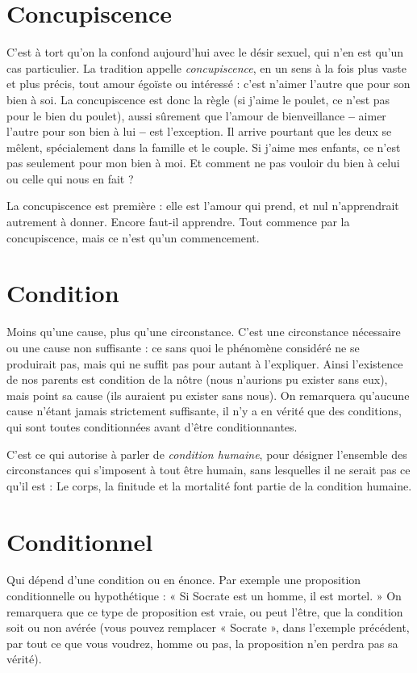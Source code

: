 \section{Concupiscence}
C’est à tort qu’on la confond aujourd’hui avec le
désir sexuel, qui n’en est qu’un cas particulier. La tradition
appelle {\it concupiscence}, en un sens à la fois plus vaste et plus précis, tout
amour égoïste ou intéressé : c’est n’aimer l’autre que pour son bien à soi. La
concupiscence est donc la règle (si j'aime le poulet, ce n’est pas pour le bien du
poulet), aussi sûrement que l’amour de bienveillance {\bf --} aimer l’autre pour son
bien à lui {\bf --} est l’exception. Il arrive pourtant que les deux se mêlent, spécialement
dans la famille et le couple. Si j’aime mes enfants, ce n’est pas seulement
pour mon bien à moi. Et comment ne pas vouloir du bien à celui ou celle qui
nous en fait ?

La concupiscence est première : elle est l’amour qui prend, et nul n’apprendrait
autrement à donner. Encore faut-il apprendre. Tout commence par la
concupiscence, mais ce n’est qu'un commencement.

\section{Condition}
Moins qu’une cause, plus qu’une circonstance. C’est une
circonstance nécessaire ou une cause non suffisante : ce sans
quoi le phénomène considéré ne se produirait pas, mais qui ne suffit pas pour
autant à l'expliquer. Ainsi l’existence de nos parents est condition de la nôtre
(nous n’aurions pu exister sans eux), mais point sa cause (ils auraient pu exister
sans nous). On remarquera qu'aucune cause n'étant jamais strictement suffisante,
il n’y a en vérité que des conditions, qui sont toutes conditionnées avant
d’être conditionnantes.

C’est ce qui autorise à parler de {\it condition humaine}, pour désigner
l’ensemble des circonstances qui s'imposent à tout être humain, sans lesquelles
il ne serait pas ce qu’il est : Le corps, la finitude et la mortalité font partie de la
condition humaine.

\section{Conditionnel}
Qui dépend d’une condition ou en énonce. Par exemple
une proposition conditionnelle ou hypothétique : « Si
Socrate est un homme, il est mortel. » On remarquera que ce type de proposition
est vraie, ou peut l’être, que la condition soit ou non avérée (vous pouvez
remplacer « Socrate », dans l'exemple précédent, par tout ce que vous voudrez,
homme ou pas, la proposition n’en perdra pas sa vérité).

